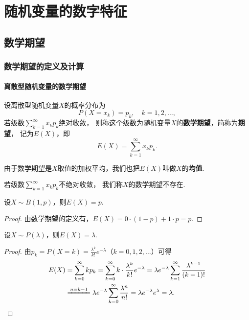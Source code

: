 \chapter{随机变量的数字特征}
\section{数学期望}
\subsection{数学期望的定义及计算}
\subsubsection{离散型随机变量的数学期望}
\begin{definition}
设离散型随机变量\(X\)的概率分布为\[
P(X=x_k) = p_k, \quad k=1,2,\dotsc,
\]若级数\(\sum\limits_{k=1}^{\infty}{x_k p_k}\)绝对收敛，%
则称这个级数为随机变量\(X\)的\textbf{数学期望}，简称为\textbf{期望}，%
记为\(E(X)\)，即\begin{equation}\label{equation:随机变量的数字特征.数学期望的定义式}
E(X) = \sum\limits_{k=1}^{\infty} x_k p_k.
\end{equation}

由于数学期望是\(X\)取值的加权平均，我们也把\(E(X)\)叫做\(X\)的\textbf{均值}.

若级数\(\sum\limits_{k=1}^{\infty} x_k p_k\)不绝对收敛，%
我们称\(X\)的数学期望不存在.
\end{definition}

\begin{theorem}\label{theorem:随机变量的数字特征.0-1分布的数学期望}
设\(X \sim B(1,p)\)，则\(E(X) = p\).
\begin{proof}
由数学期望的定义有，\(E(X) = 0 \cdot (1-p) + 1 \cdot p = p\).
\end{proof}
\end{theorem}

\begin{theorem}\label{theorem:随机变量的数字特征.泊松分布的数学期望}
设\(X \sim P(\lambda)\)，则\(E(X) = \lambda\).
\begin{proof}
由\(p_k = P(X=k) = \frac{\lambda^k}{k!} e^{-\lambda}\)（\(k=0,1,2,\dotsc\)）可得
\begin{align*}
E(X) &= \sum\limits_{k=0}^{\infty}{k p_k}
= \sum\limits_{k=0}^{\infty}{k \cdot \frac{\lambda^k}{k!} e^{-\lambda}}
= \lambda e^{-\lambda} \sum\limits_{k=1}^{\infty}{\frac{\lambda^{k-1}}{(k-1)!}} \\
&\xlongequal{n=k-1} \lambda e^{-\lambda} \sum\limits_{k=0}^{\infty}{\frac{\lambda^{n}}{n!}}
= \lambda e^{-\lambda} e^{\lambda} = \lambda.
\qedhere
\end{align*}
\end{proof}
\end{theorem}

